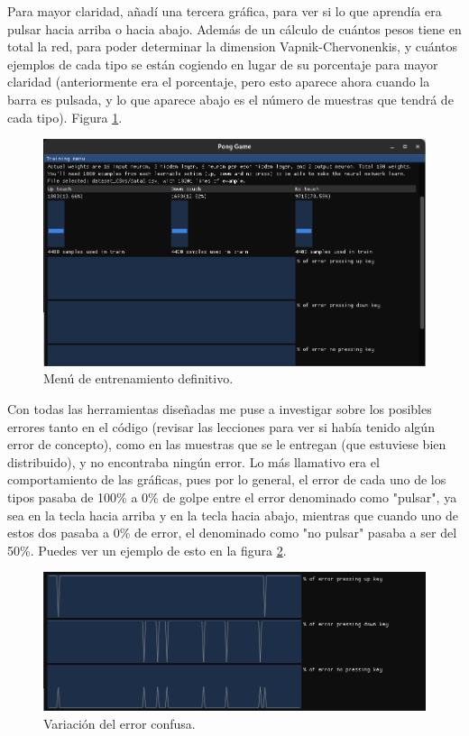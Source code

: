 Para mayor claridad, añadí una tercera gráfica, para ver si lo que aprendía era pulsar hacia arriba o hacia abajo. Además de un cálculo de cuántos pesos tiene en total la red, para poder determinar la dimension Vapnik-Chervonenkis, y cuántos ejemplos de cada tipo se están cogiendo en lugar de su porcentaje para mayor claridad (anteriormente era el porcentaje, pero esto aparece ahora cuando la barra es pulsada, y lo que aparece abajo es el número de muestras que tendrá de cada tipo). Figura \ref{ultimo menu de entrenamiento}.
\begin{figure}[H]
	\centering
	\includegraphics[width=15cm]{archivos/imagenes/menu-de-entrenamiento-definitivo.png}
	\caption{Menú de entrenamiento definitivo.}
	\label{ultimo menu de entrenamiento}
\end{figure}

Con todas las herramientas diseñadas me puse a investigar sobre los posibles errores tanto en el código (revisar las lecciones para ver si había tenido algún error de concepto), como en las muestras que se le entregan (que estuviese bien distribuido), y no encontraba ningún error. Lo más llamativo era el comportamiento de las gráficas, pues por lo general, el error de cada uno de los tipos pasaba de 100\% a 0\% de golpe entre el error denominado como "pulsar", ya sea en la tecla hacia arriba y en la tecla hacia abajo, mientras que cuando uno de estos dos pasaba a 0\% de error, el denominado como "no pulsar" pasaba a ser del 50\%. Puedes ver un ejemplo de esto en la figura \ref{error erratico}.
\begin{figure}[H]
	\centering
	\includegraphics[width=15cm]{archivos/imagenes/error-erratico.png}
	\caption{Variación del error confusa.}
	\label{error erratico}
\end{figure}

